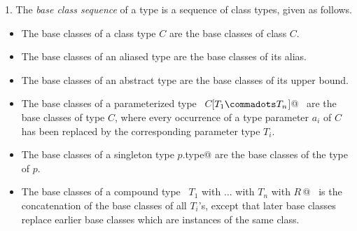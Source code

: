\documentclass[a4paper,12pt,twoside,titlepage]{book}
\begin{document}
1. The {\em base class sequence} of a type is a sequence of class types, 
given as follows.
\begin{itemize}
\item
The base classes of a class type $C$ are the base classes of class
$C$.
\item
The base classes of an aliased type are the base classes of its alias.
\item
The base classes of an abstract type are the base classes of its upper bound.
\item
The base classes of a parameterized type ~\lstinline@$C$[$T_1 \commadots T_n$]@~ are the base classes
of type $C$, where every occurrence of a type parameter $a_i$ 
of $C$ has been replaced by the corresponding parameter type $T_i$.
\item
The base classes of a singleton type \lstinline@$p$.type@ are the base classes of
the type of $p$.
\item
The base classes of a compound type
~\lstinline@$T_1$ with $\ldots$ with $T_n$ with {$R\,$}@~ is the concatenation of the
base classes of all $T_i$'s, except that later base classes replace
earlier base classes which are instances of the same class.
\end{itemize}
\end{document}
